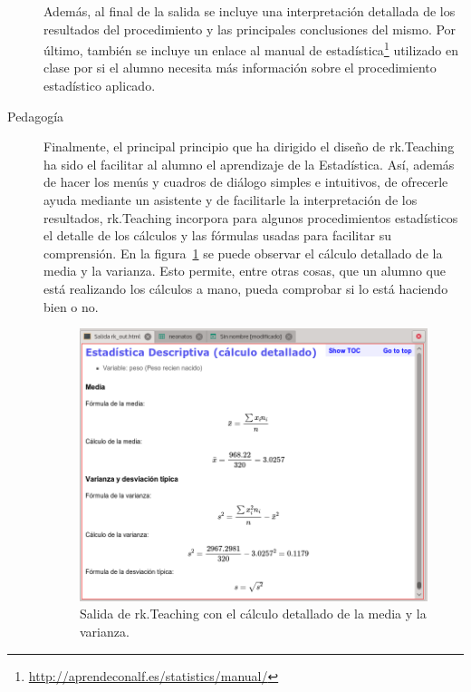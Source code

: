 \documentclass[a4paper,10pt,twoside]{article}
\newcommand{\rkteaching}{\textsf{rk.Teaching}}
\begin{document}
\begin{description}
Además, al final de la salida se incluye una interpretación detallada de los resultados del procedimiento y las
principales conclusiones del mismo.
Por último, también se incluye un enlace al manual de estadística\footnote{\url{http://aprendeconalf.es/statistics/manual/}} utilizado en
clase por si el alumno necesita más información sobre el procedimiento estadístico aplicado. 

\item[Pedagogía] Finalmente, el principal principio que ha dirigido el diseño de \rkteaching{} ha sido el facilitar al
alumno el aprendizaje de la Estadística.
Así, además de hacer los menús y cuadros de diálogo simples e intuitivos, de ofrecerle ayuda mediante un asistente y de
facilitarle la interpretación de los resultados, \rkteaching{} incorpora para algunos procedimientos estadísticos el
detalle de los cálculos y las fórmulas usadas para facilitar su comprensión.
En la figura~\ref{f:calculo-detallado} se puede observar el cálculo detallado de la media y la varianza.
Esto permite, entre otras cosas, que un alumno que está realizando los cálculos a mano, pueda comprobar si lo está
haciendo bien o no.

\begin{figure}[htp]
\begin{center}
\includegraphics[width=\textwidth]{img/calculo_detallado.png}
\caption{Salida de \rkteaching{} con el cálculo detallado de la media y la varianza.}
\label{f:calculo-detallado}
\end{center}
\end{figure}


\end{description}
\end{document}
